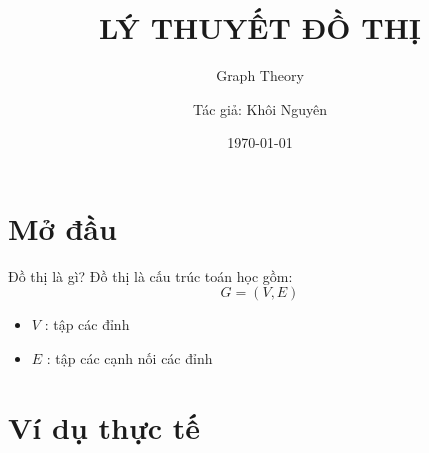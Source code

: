 \documentclass{beamer}
\title{\textbf{LÝ THUYẾT ĐỒ THỊ}}
\subtitle{Graph Theory}
\author{Tác giả: Khôi Nguyên}
\date{\today}
\begin{document}
\frame{\titlepage}

\section{Mở đầu}
\begin{frame}{Đồ thị là gì?}
Đồ thị là cấu trúc toán học gồm:
\[ G = (V,E) \]
\begin{itemize}
\item $V$ : tập các đỉnh
\item $E$ : tập các cạnh nối các đỉnh
\end{itemize}
\end{frame}

\section{Ví dụ thực tế}
\end{document}
